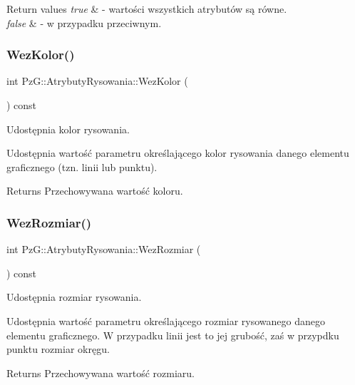 \begin{DoxyRetVals}{Return values}
{\em true} & -\/ wartości wszystkich atrybutów są równe. \\
\hline
{\em false} & -\/ w przypadku przeciwnym. \\
\hline
\end{DoxyRetVals}
\mbox{\label{class_pz_g_1_1_atrybuty_rysowania_a27e26e90c6e5ccf76188e16fb81b2644}} 
\subsubsection{\texorpdfstring{WezKolor()}{WezKolor()}}
{\footnotesize\ttfamily int Pz\+G\+::\+Atrybuty\+Rysowania\+::\+Wez\+Kolor (\begin{DoxyParamCaption}{ }\end{DoxyParamCaption}) const\hspace{0.3cm}{\ttfamily [inline]}}



Udostępnia kolor rysowania. 

Udostępnia wartość parametru określającego kolor rysowania danego elementu graficznego (tzn. linii lub punktu). \begin{DoxyReturn}{Returns}
Przechowywana wartość koloru. 
\end{DoxyReturn}
\mbox{\label{class_pz_g_1_1_atrybuty_rysowania_a9f0f08bb69dca9c12e7f55c165c6223e}} 
\subsubsection{\texorpdfstring{WezRozmiar()}{WezRozmiar()}}
{\footnotesize\ttfamily int Pz\+G\+::\+Atrybuty\+Rysowania\+::\+Wez\+Rozmiar (\begin{DoxyParamCaption}{ }\end{DoxyParamCaption}) const\hspace{0.3cm}{\ttfamily [inline]}}



Udostępnia rozmiar rysowania. 

Udostępnia wartość parametru określającego rozmiar rysowanego danego elementu graficznego. W przypadku linii jest to jej grubość, zaś w przypdku punktu rozmiar okręgu. \begin{DoxyReturn}{Returns}
Przechowywana wartość rozmiaru. 
\end{DoxyReturn}
\mbox{\label{class_pz_g_1_1_atrybuty_rysowania_a85f1665049d64618e1ac1d18c000ff76}} 
